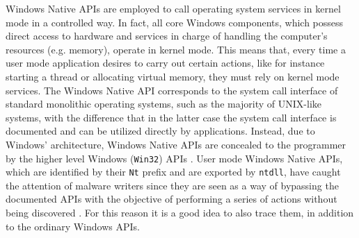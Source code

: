 Windows Native APIs are employed to call operating system services in kernel mode in a controlled way.  
In fact, all core Windows components, which possess direct access to hardware and services in charge of handling the computer's resources (e.g. memory), operate in kernel mode. This means that, every time a user mode application desires to carry out certain actions, like for instance starting a thread or allocating virtual memory, they must rely on kernel mode  services. The Windows Native API corresponds to the system call interface of standard monolithic operating systems, such as the majority of UNIX-like systems, with the difference that in the latter case the system call interface is documented and can be utilized directly by applications. Instead, due to Windows' architecture, Windows Native APIs are concealed to the programmer by the higher level Windows (\texttt{Win32}) APIs \cite{NTAPI1}. User mode Windows Native APIs, which are identified by their \texttt{Nt} prefix and are exported by \texttt{ntdll}, have caught the attention of malware writers since they are seen as a way of bypassing the documented APIs with the objective of performing a series of actions without being discovered \cite{NTAPI2}. For this reason it is a good idea to also trace them, in addition to the ordinary Windows APIs.  

